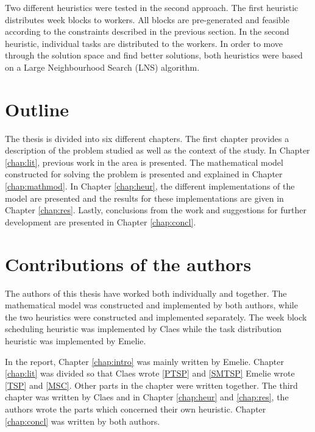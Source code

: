 Two different heuristics were tested in the second approach. The first heuristic distributes week blocks to workers. All blocks are pre-generated and feasible according to the constraints described in the previous section. In the second heuristic, individual tasks are distributed to the workers. In order to move through the solution space and find better solutions, both heuristics were based on a Large Neighbourhood Search (LNS) algorithm.

\section{Outline}

The thesis is divided into six different chapters. The first chapter provides a description of the problem studied as well as the context of the study. In Chapter \ref{chap:lit}, previous work in the area is presented. The mathematical model constructed for solving the problem is presented and explained in Chapter \ref{chap:mathmod}. In Chapter \ref{chap:heur}, the different implementations of the model are presented and the results for these implementations are given in Chapter \ref{chap:res}. Lastly, conclusions from the work and suggestions for further development are presented in Chapter \ref{chap:concl}.

\section{Contributions of the authors}

The authors of this thesis have worked both individually and together. The mathematical model was constructed and implemented by both authors, while the two heuristics were constructed and implemented separately. The week block scheduling heuristic was implemented by Claes while the task distribution heuristic was implemented by Emelie.

In the report, Chapter \ref{chap:intro} was mainly written by Emelie. Chapter \ref{chap:lit} was divided so that Claes wrote \ref{PTSP} and \ref{SMTSP} Emelie wrote \ref{TSP} and \ref{MSC}. Other parts in the chapter were written together. The third chapter was written by Claes and in Chapter \ref{chap:heur} and \ref{chap:res}, the authors wrote the parts which concerned their own heuristic. Chapter \ref{chap:concl} was written by both authors.
 

